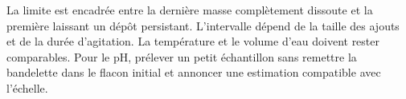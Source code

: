 \par\noindent\begin{minipage}{\linewidth}
\label{cor-activite-4}
La limite est encadrée entre la dernière masse complètement dissoute et la première laissant un dépôt persistant. L’intervalle dépend de la taille des ajouts et de la durée d’agitation. La température et le volume d’eau doivent rester comparables. Pour le pH, prélever un petit échantillon sans remettre la bandelette dans le flacon initial et annoncer une estimation compatible avec l’échelle.\par\end{minipage}
